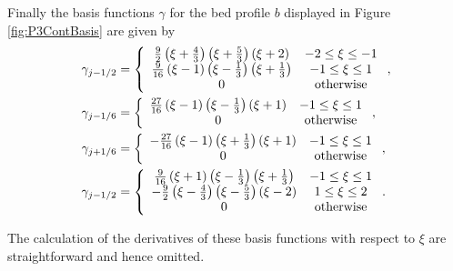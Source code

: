 Finally the basis functions $\gamma$ for the bed profile $b$ displayed in Figure \ref{fig:P3ContBasis} are given by
\begin{align}
\gamma_{j-1/2} &= \left\lbrace \begin{array}{c c}
\frac{9}{2}\left(\xi + \frac{4}{3}\right)\left(\xi + \frac{5}{3}\right)\left(\xi + 2\right) & -2 \le \xi \le -1\\
\frac{9}{16}\left(\xi - 1\right)\left(\xi - \frac{1}{3}\right)\left(\xi  + \frac{1}{3}\right) & -1 \le \xi \le 1\\
0 & \text{otherwise} 
\end{array} \right. ,\\
\gamma_{j-1/6} &= \left\lbrace \begin{array}{c c}
\frac{27}{16}\left(\xi - 1\right)\left(\xi - \frac{1}{3}\right)\left(\xi + 1\right) & -1 \le \xi \le 1\\
0 & \text{otherwise} 
\end{array} \right. ,\\
\gamma_{j+1/6} &= \left\lbrace \begin{array}{c c}
-\frac{27}{16}\left(\xi - 1\right)\left(\xi + \frac{1}{3}\right)\left(\xi + 1\right) & -1 \le \xi \le 1\\
0 & \text{otherwise} 
\end{array} \right. ,\\
\gamma_{j-1/2} &= \left\lbrace \begin{array}{c c}
\frac{9}{16}\left(\xi + 1\right)\left(\xi - \frac{1}{3}\right)\left(\xi  + \frac{1}{3}\right) & -1 \le \xi \le 1\\
-\frac{9}{2}\left(\xi - \frac{4}{3}\right)\left(\xi - \frac{5}{3}\right)\left(\xi - 2\right) & 1 \le \xi \le 2\\
0 & \text{otherwise} 
\end{array} \right. .
\end{align}

The calculation of the derivatives of these basis functions with respect to $\xi$ are straightforward and hence omitted. 
